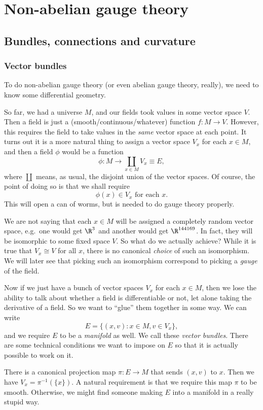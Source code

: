 \documentclass[a4paper]{article}
\begin{document}
\section{Non-abelian gauge theory}
\subsection{Bundles, connections and curvature}
\subsubsection*{Vector bundles}
To do non-abelian gauge theory (or even abelian gauge theory, really), we need to know some differential geometry.

So far, we had a universe $M$, and our fields took values in some vector space $V$. Then a field is just a (smooth/continuous/whatever) function $f: M \to V$. However, this requires the field to take values in the \emph{same} vector space at each point. It turns out it is a more natural thing to assign a vector space $V_x$ for each $x \in M$, and then a field $\phi$ would be a function
\[
  \phi: M \to \coprod_{x \in M} V_x \equiv E,
\]
where $\coprod$ means, as usual, the disjoint union of the vector spaces. Of course, the point of doing so is that we shall require
\[
  \phi(x) \in V_x \text{ for each $x$}.\tag{$*$}
\]
This will open a can of worms, but is needed to do gauge theory properly.

We are not saying that each $x \in M$ will be assigned a completely random vector space, e.g.\ one would get $\R^3$ and another would get $\R^{144169}$. In fact, they will be isomorphic to some fixed space $V$. So what do we actually achieve? While it is true that $V_x \cong V$ for all $x$, there is no canonical \emph{choice} of such an isomorphism. We will later see that picking such an isomorphism correspond to picking a \emph{gauge} of the field.

Now if we just have a bunch of vector spaces $V_x$ for each $x \in M$, then we lose the ability to talk about whether a field is differentiable or not, let alone taking the derivative of a field. So we want to ``glue'' them together in some way. We can write
\[
  E = \{(x, v): x \in M, v \in V_x\},
\]
and we require $E$ to be a \emph{manifold} as well. We call these \emph{vector bundles}. There are some technical conditions we want to impose on $E$ so that it is actually possible to work on it.

There is a canonical projection map $\pi: E \to M$ that sends $(x, v)$ to $x$. Then we have $V_x = \pi^{-1}(\{x\})$. A natural requirement is that we require this map $\pi$ to be smooth. Otherwise, we might find someone making $E$ into a manifold in a really stupid way.
\end{document}
